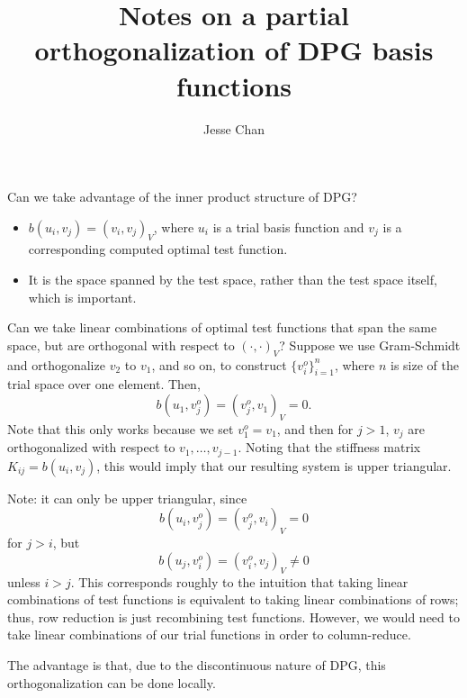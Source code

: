 \documentclass[final,leqno]{siamltex}
\title{Notes on a partial orthogonalization of DPG basis functions}
\author{Jesse Chan}
\date{}
\begin{document}
\maketitle

Can we take advantage of the inner product structure of DPG?  
\begin{itemize}
\item $b(u_i,v_j) = (v_i,v_j)_V$, where $u_i$ is a trial basis function and $v_j$ is a corresponding computed optimal test function.  
\item It is the space spanned by the test space, rather than the test space itself, which is important.  
\end{itemize}

Can we take linear combinations of optimal test functions that span the same space, but are orthogonal with respect to $(\cdot,\cdot)_V$?  Suppose we use Gram-Schmidt and orthogonalize $v_2$ to $v_1$, and so on, to construct $\{v_i^o\}_{i=1}^{n}$, where $n$ is size of the trial space over one element.  Then, 
\[
b(u_1,v_j^o) = (v_j^o,v_1)_V = 0.  
\]
Note that this only works because we set $v_1^o = v_1$, and then for $j>1$, $v_j$ are orthogonalized with respect to $v_1,\ldots, v_{j-1}$.  Noting that the stiffness matrix $K_{ij} = b(u_i,v_j)$, this would imply that our resulting system is upper triangular.  

Note: it can only be upper triangular, since
\[
b(u_i,v_j^o) = (v_j^o,v_i)_V = 0
\]
for $j>i$, but 
\[
b(u_j,v_i^o) = (v_i^o,v_j)_V \neq 0
\]
unless $i>j$.  This corresponds roughly to the intuition that taking linear combinations of test functions is equivalent to taking linear combinations of rows; thus, row reduction is just recombining test functions.  However, we would need to take linear combinations of our trial functions in order to column-reduce.

The advantage is that, due to the discontinuous nature of DPG, this orthogonalization can be done locally.  



\end{document}
